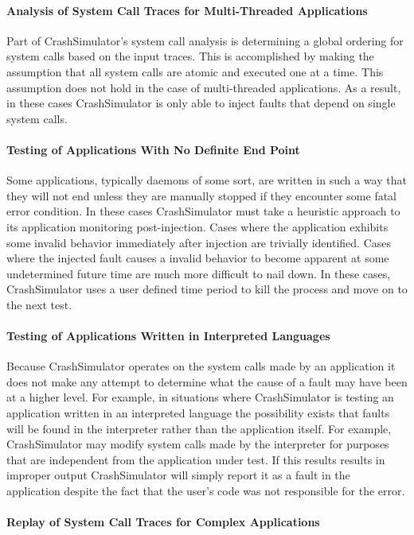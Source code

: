         \paragraph{Analysis of System Call Traces for Multi-Threaded Applications}

            Part of CrashSimulator's system call analysis is determining a global ordering for system calls based on the
            input traces. This is accomplished by making the assumption that all system calls are atomic and executed
            one at a time. This assumption does not hold in the case of multi-threaded applications. As a result, in
            these cases CrashSimulator is only able to inject faults that depend on single system calls.

        \paragraph{Testing of Applications With No Definite End Point}

            Some applications, typically daemons of some sort, are written in such a way that they will not end unless
            they are manually stopped if they encounter some fatal error condition. In these cases CrashSimulator must
            take a heuristic approach to its application monitoring post-injection. Cases where the application exhibits
            some invalid behavior immediately after injection are trivially identified. Cases where the injected fault
            causes a invalid behavior to become apparent at some undetermined future time are much more difficult to
            nail down. In these cases, CrashSimulator uses a user defined time period to kill the process and move on to
            the next test.

        \paragraph{Testing of Applications Written in Interpreted Languages}

            Because CrashSimulator operates on the system calls made by an application it does not make any attempt to
            determine what the cause of a fault may have been at a higher level. For example, in situations where
            CrashSimulator is testing an application written in an interpreted language the possibility exists that
            faults will be found in the interpreter rather than the application itself. For example, CrashSimulator may
            modify system calls made by the interpreter for purposes that are independent from the application under
            test.  If this results results in improper output CrashSimulator will simply report it as a fault in the
            application despite the fact that the user's code was not responsible for the error.

        \paragraph{Replay of System Call Traces for Complex Applications}


